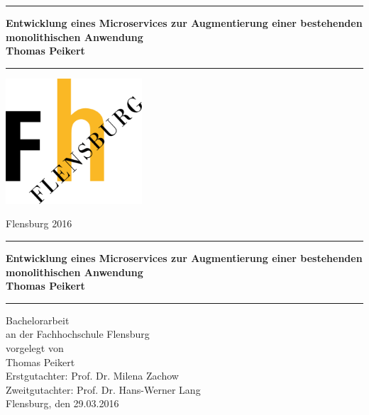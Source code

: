 \documentclass[a4paper,11pt,oneside]{book}
\newcommand{\LMUTitle}[9]{
  \thispagestyle{empty}
  \vspace*{\stretch{1}}
  {\parindent0cm
   \rule{\linewidth}{.7ex}}
  \begin{flushright}

    \vspace*{\stretch{1}}
    \sffamily\bfseries\Huge
    #1\\
    \vspace*{\stretch{1}}
    \sffamily\bfseries\large
    #2
    \vspace*{\stretch{1}}
  \end{flushright}
  \rule{\linewidth}{.7ex}
  \vspace*{\stretch{5}}
  \begin{center}
    \includegraphics[width=2in]{FHFLLogo}
  \end{center}
  \vspace*{\stretch{1}}
  \begin{center}\sffamily\LARGE{#5}\end{center}
  \newpage
  \thispagestyle{empty}

  \cleardoublepage
  \thispagestyle{empty}

  \vspace*{\stretch{1}}
  {\parindent0cm
  \rule{\linewidth}{.7ex}}
  \begin{flushright}
    \vspace*{\stretch{1}}
    \sffamily\bfseries\Huge
    #1\\
    \vspace*{\stretch{1}}
    \sffamily\bfseries\large
    #2
    \vspace*{\stretch{1}}
  \end{flushright}
  \rule{\linewidth}{.7ex}

  \vspace*{\stretch{2}}
  \begin{center}
    \Large Bachelorarbeit\\
    \Large an der Fachhochschule Flensburg\\
    \vspace*{\stretch{1}}
    \Large vorgelegt von\\
    \Large #2\\
    \vspace*{\stretch{1}}
    \large Erstgutachter:  #7 \\[1mm]
    \large Zweitgutachter: #8 \\[1mm]
    \vspace*{\stretch{1}}
    \Large Flensburg, den #6
  \end{center}

  \cleardoublepage
}
\begin{document}
  \frontmatter


  \LMUTitle
      {Entwicklung eines Microservices zur Augmentierung einer bestehenden monolithischen Anwendung}               %
      {Thomas Peikert}                       %
      {Berlin}                             %
      {Angewandte Informatik}                         %
      {Flensburg 2016}                          %
      {29.03.2016}                            %
      {Prof. Dr. Milena Zachow}                          %
      {Prof. Dr. Hans-Werner Lang}                         %
      {Pr"ufungsdatum}                         %


  \tableofcontents


  \listoffigures


  \listoftables
  \cleardoublepage


  


  \mainmatter\setcounter{page}{1}
  
  
  
  
  
  


  \backmatter
  \markboth{}{}


  
  \printbibliography
\end{document}
